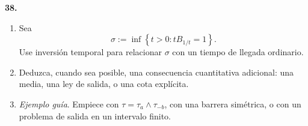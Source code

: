 \documentclass[11pt, letterpaper]{article}
\begin{document}
\newpage

\begin{ejercicio}
    \textbf{38.} 
    \begin{enumerate}
        \item Sea
        \[ \sigma := \inf\left\{t > 0 : t B_{1/t} = 1\right\}. \]
        Use inversión temporal para relacionar $\sigma$ con un tiempo de llegada ordinario.
        \item Deduzca, cuando sea posible, una consecuencia cuantitativa adicional: una media, una ley de salida, o una cota explícita.
        \item \textit{Ejemplo guía}. Empiece con $\tau = \tau_a \wedge \tau_{-b}$, con una barrera simétrica, o con un problema de salida en un intervalo finito.
    \end{enumerate}
    
\end{ejercicio}

\vspace{5mm}
\end{document}
